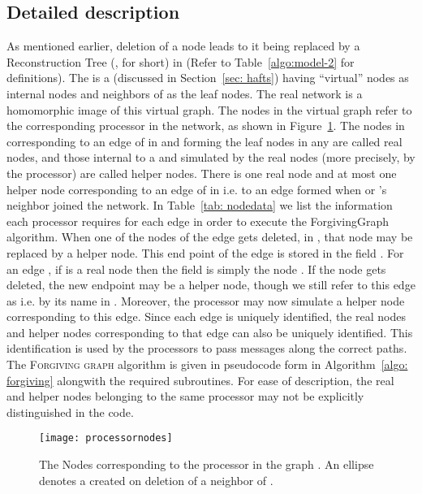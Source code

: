 \documentclass[11pt, letter]{article}
\begin{document}
\subsection{Detailed description} 
As mentioned earlier, deletion of  a node  leads to it being replaced by  a Reconstruction Tree (, for short)
in  (Refer to Table~\ref{algo:model-2} for definitions). The  is a   (discussed in  Section~\ref{sec:
hafts}) having ``virtual'' nodes as internal nodes  and neighbors of  as the leaf nodes. 
The real network is a homomorphic image of  this virtual graph. The nodes in the virtual graph refer to the
corresponding processor in the network, as shown in Figure~\ref{fig: processornodes}.  The nodes in  corresponding to
an edge of  in  and forming the leaf nodes in any  are called real nodes, and those internal to a 
and simulated by the real nodes (more precisely, by the processor) are called helper nodes. There is one real node and
at most one helper node corresponding to an edge of  in  i.e. to an edge formed when  or 's neighbor
joined the network.   In Table~\ref{tab: nodedata} we list the information each processor  requires for each edge in
order to execute the ForgivingGraph algorithm. When one of the nodes of the edge gets deleted, in , that node may be
replaced by a helper node.  This end point of the edge is stored in the field  . For an edge , if  is a real
node then the field  is simply the node . If the node  gets deleted, the new endpoint may be a helper
node, though we  still refer to this edge as  i.e. by its name in . Moreover, the processor may now simulate
a helper node corresponding to this edge. Since each edge is uniquely identified, the real nodes and helper nodes
corresponding to that edge can also be uniquely identified. This identification is used by the processors to pass
messages along the correct paths. The \textsc{Forgiving graph} algorithm is given in pseudocode form in Algorithm~\ref{algo: forgiving}
alongwith the required subroutines. For ease of description, the real and helper nodes belonging to the same processor
may not be explicitly distinguished in the code.

\begin{figure}[h!]
\centering
\texttt{[image: processornodes]}
\caption{The Nodes corresponding to the processor  in the graph . An ellipse denotes a  created on deletion of a
neighbor of .}
\label{fig: processornodes}
\end{figure}
\end{document}
